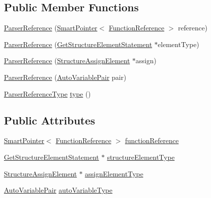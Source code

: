 \subsection*{Public Member Functions}
\begin{DoxyCompactItemize}
\item 
\hyperlink{class_scribble_core_1_1_parser_reference_a40f2688a7edc2d9721af2919b4cb14f0}{Parser\-Reference} (\hyperlink{_smart_pointer_8hpp_afdd8d4ba81c3fcbdeacf1dafba2accfb}{Smart\-Pointer}$<$ \hyperlink{class_scribble_core_1_1_function_reference}{Function\-Reference} $>$ reference)
\item 
\hyperlink{class_scribble_core_1_1_parser_reference_aaafa208d4520c88e59a4fa1771044aef}{Parser\-Reference} (\hyperlink{class_scribble_core_1_1_get_structure_element_statement}{Get\-Structure\-Element\-Statement} $\ast$element\-Type)
\item 
\hyperlink{class_scribble_core_1_1_parser_reference_a26eed5b755fdccfd1eb122166b0f0cf4}{Parser\-Reference} (\hyperlink{class_scribble_core_1_1_structure_assign_element}{Structure\-Assign\-Element} $\ast$assign)
\item 
\hyperlink{class_scribble_core_1_1_parser_reference_af40b981d02c3d768520fd4e03a9e4dec}{Parser\-Reference} (\hyperlink{namespace_scribble_core_a6c19e97eb8a6427c1f921de9e13fd534}{Auto\-Variable\-Pair} pair)
\item 
\hyperlink{namespace_scribble_core_a09019d631eedc703900d447f6965980a}{Parser\-Reference\-Type} \hyperlink{class_scribble_core_1_1_parser_reference_a9b4f48269f65478479c6466fbecac0d4}{type} ()
\end{DoxyCompactItemize}
\subsection*{Public Attributes}
\begin{DoxyCompactItemize}
\item 
\hyperlink{_smart_pointer_8hpp_afdd8d4ba81c3fcbdeacf1dafba2accfb}{Smart\-Pointer}$<$ \hyperlink{class_scribble_core_1_1_function_reference}{Function\-Reference} $>$ \hyperlink{class_scribble_core_1_1_parser_reference_ac1d91061b77ed79265e184e992b5dfe7}{function\-Reference}
\item 
\hyperlink{class_scribble_core_1_1_get_structure_element_statement}{Get\-Structure\-Element\-Statement} $\ast$ \hyperlink{class_scribble_core_1_1_parser_reference_a637e85d515b38865bfaee3f3e0314d1b}{structure\-Element\-Type}
\item 
\hyperlink{class_scribble_core_1_1_structure_assign_element}{Structure\-Assign\-Element} $\ast$ \hyperlink{class_scribble_core_1_1_parser_reference_a8aa51bfc4b87577b0f99570828a4fb9e}{assign\-Element\-Type}
\item 
\hyperlink{namespace_scribble_core_a6c19e97eb8a6427c1f921de9e13fd534}{Auto\-Variable\-Pair} \hyperlink{class_scribble_core_1_1_parser_reference_ad076a03489530a2021aac5d8d7761eed}{auto\-Variable\-Type}
\end{DoxyCompactItemize}


